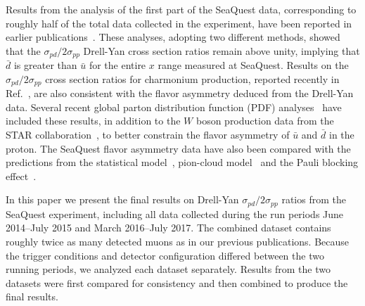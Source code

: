 \documentclass[reprint,aps,unsortedaddress,superscriptaddress,prl,floatfix,showpacs,linenumbers]{revtex4-2}
\begin{document}
Results from the analysis of the first part of the SeaQuest data, corresponding
to roughly half of the total data collected in the experiment, have been reported
in earlier publications~\cite{dove2021,dove2023}.
These analyses, adopting two different methods, showed that the
$\sigma_{pd}/2\sigma_{pp}$ Drell-Yan cross section ratios remain
above unity, implying that
$\bar{d}$ is greater than $\bar{u}$ for the entire $x$ range measured
at SeaQuest. Results on the $\sigma_{pd}/2\sigma_{pp}$  cross section ratios
for charmonium production, reported recently in
Ref.~\cite{leung2024a}, are also consistent with the flavor asymmetry
deduced from the Drell-Yan data.
Several recent global parton distribution function (PDF)
analyses~\cite{cocuzza2021,ball2022a,accardi2023,alekhin2023,harland-lang2026}
have included these results, in addition to the $W$ boson production data
from the STAR collaboration~\cite{adam2021}, to better constrain the
flavor asymmetry of $\bar u$ and $\bar d$ in the proton. The SeaQuest
flavor asymmetry data have also been compared with the predictions from the
statistical model~\cite{soffer2019}, pion-cloud model~\cite{alberg2022} and the Pauli blocking effect~\cite{chang2022,yin2023}. %

In this paper we present the final results on Drell-Yan $\sigma_{pd}/2\sigma_{pp}$ ratios from the SeaQuest experiment,
including all data collected during the run periods June 2014--July 2015 and March 2016--July 2017.
The combined dataset contains roughly twice as many detected muons as in our previous publications.
Because the trigger conditions and detector configuration differed between the two running periods,
we analyzed each dataset separately.
Results from the two datasets were first compared for consistency and then combined to produce the final results.
\end{document}
